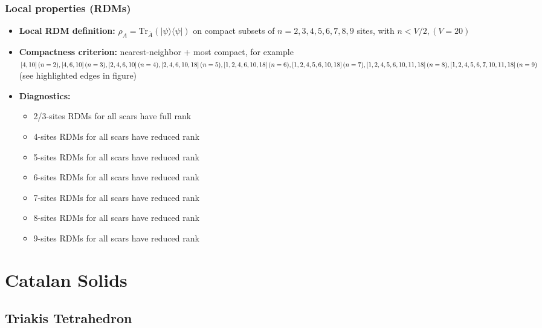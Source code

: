 \documentclass[11pt,a4paper]{article}
\begin{document}
\subsubsection*{Local properties (RDMs)}

\begin{itemize}[leftmargin=1.5em]
  \item \textbf{Local RDM definition:} $\rho_A=\mathrm{Tr}_{\bar A}(|\psi\rangle\langle\psi|)$ on compact subsets of $n=2,3,4,5,6,7,8,9$ sites, with $n < V/2, (V=20)$
  \item \textbf{Compactness criterion:} nearest-neighbor + most compact, for example $[4,10] \, (n = 2), [4,6,10] \, (n = 3), [2,4,6,10] \,  (n = 4), [2,4,6,10,18] \, (n = 5), [1,2,4,6,10,18] \, (n = 6), \newline
   [1,2,4,5,6,10,18] \, (n = 7), [1,2,4,5,6,10,11,18] \, (n = 8), [1,2,4,5,6,7,10,11,18] \, (n = 9)$ (see highlighted edges in figure)
  \item \textbf{Diagnostics:} \begin{itemize} \item 2/3-sites RDMs for all scars have full rank \item 4-sites RDMs for all scars have reduced rank \item 5-sites RDMs for all scars have reduced rank\item 6-sites RDMs for all scars have reduced rank
  \item 7-sites RDMs for all scars have reduced rank \item 8-sites RDMs for all scars have reduced rank \item 9-sites RDMs for all scars have reduced rank\end{itemize}
\end{itemize}


\section*{Catalan Solids}

\subsection*{Triakis Tetrahedron}
\end{document}

